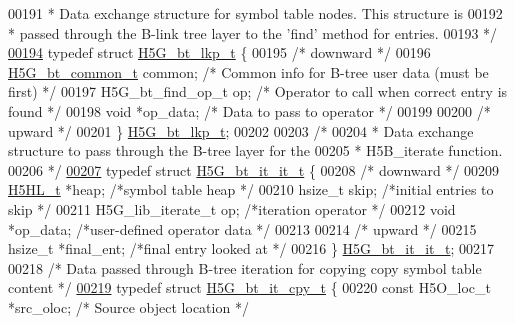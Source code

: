 \begin{DoxyCode}
00191 \textcolor{comment}{ * Data exchange structure for symbol table nodes.  This structure is}
00192 \textcolor{comment}{ * passed through the B-link tree layer to the 'find' method for entries.}
00193 \textcolor{comment}{ */}
\hyperlink{struct_h5_g__bt__lkp__t}{00194} \textcolor{keyword}{typedef} \textcolor{keyword}{struct }\hyperlink{struct_h5_g__bt__lkp__t}{H5G\_bt\_lkp\_t} \{
00195     \textcolor{comment}{/* downward */}
00196     \hyperlink{struct_h5_g__bt__common__t}{H5G\_bt\_common\_t} common;         \textcolor{comment}{/* Common info for B-tree user data (must be first) */}
00197     H5G\_bt\_find\_op\_t op;            \textcolor{comment}{/* Operator to call when correct entry is found */}
00198     \textcolor{keywordtype}{void} *op\_data;                  \textcolor{comment}{/* Data to pass to operator */}
00199 
00200     \textcolor{comment}{/* upward */}
00201 \} \hyperlink{struct_h5_g__bt__lkp__t}{H5G\_bt\_lkp\_t};
00202 
00203 \textcolor{comment}{/*}
00204 \textcolor{comment}{ * Data exchange structure to pass through the B-tree layer for the}
00205 \textcolor{comment}{ * H5B\_iterate function.}
00206 \textcolor{comment}{ */}
\hyperlink{struct_h5_g__bt__it__it__t}{00207} \textcolor{keyword}{typedef} \textcolor{keyword}{struct }\hyperlink{struct_h5_g__bt__it__it__t}{H5G\_bt\_it\_it\_t} \{
00208     \textcolor{comment}{/* downward */}
00209     \hyperlink{struct_h5_h_l__t}{H5HL\_t}      *heap;          \textcolor{comment}{/*symbol table heap                */}
00210     hsize\_t skip;       \textcolor{comment}{/*initial entries to skip            */}
00211     H5G\_lib\_iterate\_t op;   \textcolor{comment}{/*iteration operator                 */}
00212     \textcolor{keywordtype}{void}    *op\_data;   \textcolor{comment}{/*user-defined operator data             */}
00213 
00214     \textcolor{comment}{/* upward */}
00215     hsize\_t *final\_ent; \textcolor{comment}{/*final entry looked at                      */}
00216 \} \hyperlink{struct_h5_g__bt__it__it__t}{H5G\_bt\_it\_it\_t};
00217 
00218 \textcolor{comment}{/* Data passed through B-tree iteration for copying copy symbol table content */}
\hyperlink{struct_h5_g__bt__it__cpy__t}{00219} \textcolor{keyword}{typedef} \textcolor{keyword}{struct }\hyperlink{struct_h5_g__bt__it__cpy__t}{H5G\_bt\_it\_cpy\_t} \{
00220     \textcolor{keyword}{const} H5O\_loc\_t *src\_oloc;  \textcolor{comment}{/* Source object location */}

\end{DoxyCode}
